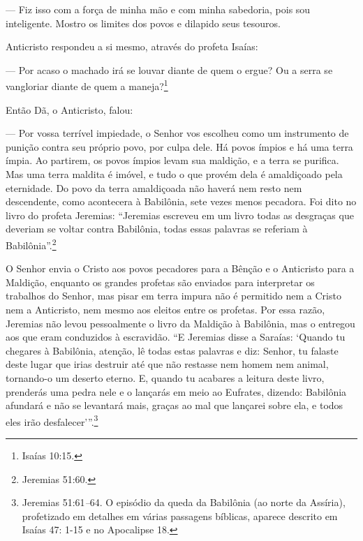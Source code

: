 --- Fiz isso com a força de minha mão e com minha sabedoria, pois sou
inteligente. Mostro os limites dos povos e dilapido seus tesouros.

Anticristo respondeu a si mesmo, através do profeta Isaías:

--- Por acaso o machado irá se louvar diante de quem o ergue? Ou a serra
se vangloriar diante de quem a maneja?\footnote{Isaías 10:15.}

Então Dã, o Anticristo, falou:

--- Por vossa terrível impiedade, o Senhor vos escolheu como um
instrumento de punição contra seu próprio povo, por culpa dele. Há povos
ímpios e há uma terra ímpia. Ao partirem, os povos ímpios levam sua
maldição, e a terra se purifica. Mas uma terra maldita é imóvel, e tudo
o que provém dela é amaldiçoado pela eternidade. Do povo da terra
amaldiçoada não haverá nem resto nem descendente, como acontecera à
Babilônia, sete vezes menos pecadora. Foi dito no livro do profeta
Jeremias: ``Jeremias escreveu em um livro todas as desgraças que
deveriam se voltar contra Babilônia, todas essas palavras se referiam à
Babilônia''.\footnote{Jeremias 51:60.}

O Senhor envia o Cristo aos povos pecadores para a Bênção e o Anticristo
para a Maldição, enquanto os grandes profetas são enviados para
interpretar os trabalhos do Senhor, mas pisar em terra impura não é
permitido nem a Cristo nem a Anticristo, nem mesmo aos eleitos entre os
profetas. Por essa razão, Jeremias não levou pessoalmente o livro da
Maldição à Babilônia, mas o entregou aos que eram conduzidos à
escravidão. ``E Jeremias disse a Saraías: `Quando tu chegares à
Babilônia, atenção, lê todas estas palavras e diz: Senhor, tu falaste
deste lugar que irias destruir até que não restasse nem homem nem
animal, tornando-o um deserto eterno. E, quando tu acabares a leitura
deste livro, prenderás uma pedra nele e o lançarás em meio ao Eufrates,
dizendo: Babilônia afundará e não se levantará mais, graças ao mal que
lançarei sobre ela, e todos eles irão desfalecer'''.\footnote{Jeremias
  51:61\emph{--}64. O episódio da queda da Babilônia (ao norte da
  Assíria), profetizado em detalhes em várias passagens bíblicas,
  aparece descrito em Isaías 47: 1-15 e no Apocalipse 18.}


